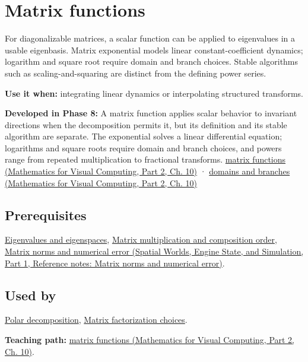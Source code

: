 \hypertarget{appendix-0f4bc2bf2b1f}{}\label{referencestart:appendix-0f4bc2bf2b1f}
\section{Matrix functions}\label{appendix-0f4bc2bf2b1f-matrix-functions}

\hypertarget{appendix-0f4bc2bf2b1f-matrix-functions}{}

For diagonalizable matrices, a scalar function can be applied to eigenvalues in a usable eigenbasis. Matrix exponential models linear constant-coefficient dynamics; logarithm and square root require domain and branch choices. Stable algorithms such as scaling-and-squaring are distinct from the defining power series.

\textbf{Use it when:} integrating linear dynamics or interpolating structured transforms.

\textbf{Developed in Phase 8:} A matrix function applies scalar behavior to invariant directions when the decomposition permits it, but its definition and its stable algorithm are separate. The exponential solves a linear differential equation; logarithms and square roots require domain and branch choices, and powers range from repeated multiplication to fractional transforms. \href{../02-Mathematics-for-Visual-Computing-P02/main.pdf\#02-foundations-ii-ch026-matrix-functions-turn-repeated-linear-actions-into-one-operator}{matrix functions (Mathematics for Visual Computing, Part 2, Ch. 10)} · \href{../02-Mathematics-for-Visual-Computing-P02/main.pdf\#02-foundations-ii-ch026-logarithms-and-square-roots-need-domains-and-branches}{domains and branches (Mathematics for Visual Computing, Part 2, Ch. 10)}

\subsection{Prerequisites}\label{appendix-0f4bc2bf2b1f-prerequisites}

\hypertarget{appendix-0f4bc2bf2b1f-prerequisites}{}

\hyperref[appendix-0b3be18411f9]{Eigenvalues and eigenspaces}, \hyperref[appendix-ab31ef447dbf]{Matrix multiplication and composition order}, \href{../05-Spatial-Worlds-Engine-State-and-Simulation-P01/main.pdf\#appendix-f8657bac66e5}{Matrix norms and numerical error (Spatial Worlds, Engine State, and Simulation, Part 1, Reference notes: Matrix norms and numerical error)}.

\subsection{Used by}\label{appendix-0f4bc2bf2b1f-used-by}

\hypertarget{appendix-0f4bc2bf2b1f-used-by}{}

\hyperref[appendix-73f5bcf7a462]{Polar decomposition}, \hyperref[appendix-221a483bec2d]{Matrix factorization choices}.

\textbf{Teaching path:} \href{../02-Mathematics-for-Visual-Computing-P02/main.pdf\#02-foundations-ii-ch026-matrix-functions-turn-repeated-linear-actions-into-one-operator}{matrix functions (Mathematics for Visual Computing, Part 2, Ch. 10)}.
